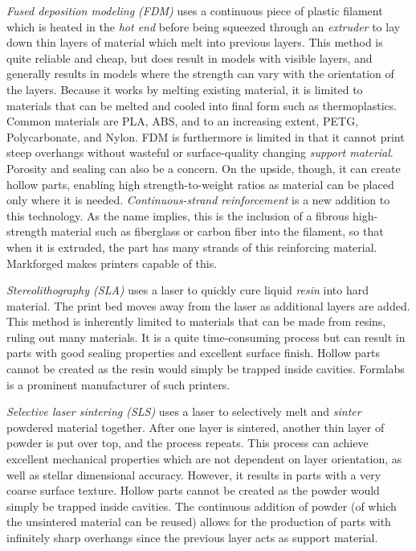 \documentclass[10pt,letterpaper]{book}
\begin{document}
 	\begin{asparaenum}[a)]
 		\item \textit{Fused deposition modeling (FDM)} uses a continuous piece of plastic filament which is heated in the \textit{hot end} before being squeezed through an \textit{extruder} to lay down thin layers of material which melt into previous layers. This method is quite reliable and cheap, but does result in models with visible layers, and generally results in models where the strength can vary with the orientation of the layers.
 		Because it works by melting existing material, it is limited to materials that can be melted and cooled into final form such as thermoplastics. Common materials are PLA, ABS, and to an increasing extent, PETG, Polycarbonate, and Nylon. FDM is furthermore is limited in that it cannot print steep overhangs without wasteful or surface-quality changing \textit{support material}. Porosity and sealing can also be a concern. On the upside, though, it can create hollow parts, enabling high strength-to-weight ratios as material can be placed only where it is needed.
 		\textit{Continuous-strand reinforcement} is a new addition to this technology. As the name implies, this is the inclusion of a fibrous high-strength material such as fiberglass or carbon fiber into the filament, so that when it is extruded, the part has many strands of this reinforcing material. Markforged makes printers capable of this.
 		\item \textit{Stereolithography (SLA)} uses a laser to quickly cure liquid \textit{resin} into hard material. The print bed moves away from the laser as additional layers are added. This method is inherently limited to materials that can be made from resins, ruling out many materials. It is a quite time-consuming process but can result in parts with good sealing properties and excellent surface finish. Hollow parts cannot be created as the resin would simply be trapped inside cavities. Formlabs is a prominent manufacturer of such printers.
 		\item \textit{Selective laser sintering (SLS)} uses a laser to selectively melt and \textit{sinter} powdered material together. After one layer is sintered, another thin layer of powder is put over top, and the process repeats. This process can achieve excellent mechanical properties which are not dependent on layer orientation, as well as stellar dimensional accuracy. However, it results in parts with a very coarse surface texture. Hollow parts cannot be created as the powder would simply be trapped inside cavities. The continuous addition of powder (of which the unsintered material can be reused) allows for the production of parts with infinitely sharp overhangs since the previous layer acts as support material.
 	\end{asparaenum}
 	
\end{document}

